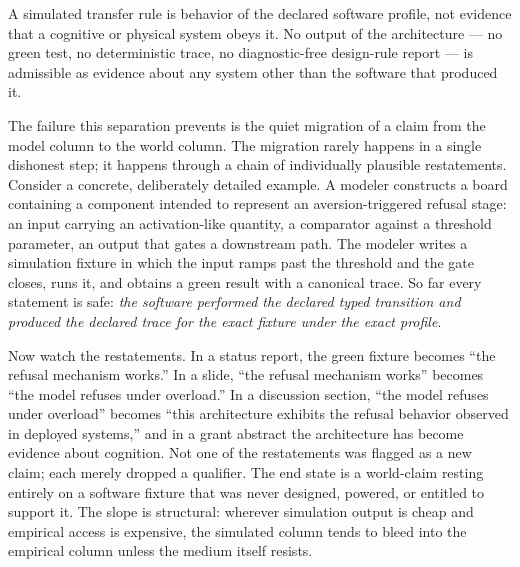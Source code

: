\begin{ruleenv}\label{ch01:rule:modelworld}
A simulated transfer rule is behavior of the declared software profile, not
evidence that a cognitive or physical system obeys it. No output of the
architecture --- no green test, no deterministic trace, no diagnostic-free
design-rule report --- is admissible as evidence about any system other than
the software that produced it.
\end{ruleenv}

The failure this separation prevents is the quiet migration of a claim from
the model column to the world column. The migration rarely happens in a
single dishonest step; it happens through a chain of individually plausible
restatements. Consider a concrete, deliberately detailed example. A modeler
constructs a board containing a component intended to represent an
aversion-triggered refusal stage: an input carrying an activation-like
quantity, a comparator against a threshold parameter, an output that gates a
downstream path. The modeler writes a simulation fixture in which the input
ramps past the threshold and the gate closes, runs it, and obtains a green
result with a canonical trace. So far every statement is safe: \emph{the
software performed the declared typed transition and produced the declared
trace for the exact fixture under the exact profile}.

Now watch the restatements. In a status report, the green fixture becomes
``the refusal mechanism works.'' In a slide, ``the refusal mechanism works''
becomes ``the model refuses under overload.'' In a discussion section, ``the
model refuses under overload'' becomes ``this architecture exhibits the
refusal behavior observed in deployed systems,'' and in a grant abstract the
architecture has become evidence about cognition. Not one of the
restatements was flagged as a new claim; each merely dropped a
qualifier. The end state is a world-claim resting entirely on a software
fixture that was never designed, powered, or entitled to support it. The
slope is structural: wherever simulation output is cheap and empirical
access is expensive, the simulated column tends to bleed into the empirical
column unless the medium itself resists.

